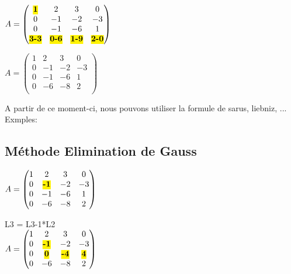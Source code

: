 \vspace{5mm} %

$
A =
\begin{pmatrix}
  \hl{\textbf{1}} & 2 & 3 & 0 \\
  0 & -1 & -2 & -3 \\
  0 & -1 & -6 & 1 \\
  \hl{\textbf{3-3}} & \hl{\textbf{0-6}} & \hl{\textbf{1-9}} & \hl{\textbf{2-0}} \\
\end{pmatrix}
$

\vspace{5mm} %

$
A =
\begin{pmatrix}
  1 & 2 & 3 & 0   \\
  0 & -1 & -2 & -3   \\
  0 & -1 & -6 & 1 \\
  0 & -6 & -8 & 2 \\
\end{pmatrix}
$

A partir de ce moment-ci, nous pouvons utiliser la formule de sarus, liebniz, ... \\
Exmples: \\

\subsection{Méthode Elimination de Gauss}

\vspace{5mm} %

$
A =
\begin{pmatrix}
  1 & 2 & 3 & 0   \\
  0 & \hl{\textbf{-1}} & -2 & -3   \\
  0 & -1 & -6 & 1 \\
  0 & -6 & -8 & 2 \\
\end{pmatrix}
$

\vspace{5mm} %

L3 = L3-1*L2 \\

$
A =
\begin{pmatrix}
  1 & 2 & 3 & 0    \\
  0 & \hl{\textbf{-1}} & -2 & -3 \\
  0 & \hl{\textbf{0}} & \hl{\textbf{-4}} & \hl{\textbf{4}}   \\
  0 & -6 & -8 & 2  \\
\end{pmatrix}
$


